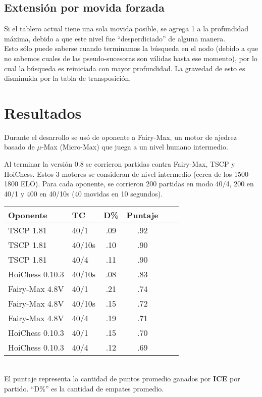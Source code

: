 \documentclass{article}
\newcommand{\ICE}[0]{{\bf ICE}}
\begin{document}
\begin{multicols}{2}
\subsection{Extensión por movida forzada}
Si el tablero actual tiene una sola movida posible, se agrega 1 a la
profundidad máxima, debido a que este nivel fue ``desperdiciado'' de
alguna manera.
\\

Esto sólo puede saberse cuando terminamos la búsqueda en el nodo
(debido a que no sabemos cuales de las pseudo-sucesoras son válidas
hasta ese momento), por lo cual la búsqueda es reiniciada con mayor
profundidad. La gravedad de esto es disminuída por la tabla de
transposición.

\section{Resultados}
Durante el desarrollo se usó de oponente a Fairy-Max\cite{fairymax}, un
motor de ajedrez basado de $\mu$-Max (Micro-Max) que juega a un nivel
humano intermedio.

Al terminar la versión 0.8 se corrieron partidas contra Fairy-Max, TSCP
y HoiChess. Estos 3 motores se consideran de nivel intermedio (cerca de
los 1500-1800 ELO). Para cada oponente, se corrieron 200 partidas en
modo 40/4, 200 en 40/1 y 400 en 40/10s (40 movidas en 10 segundos).

\begin{tabular}{|l|l|c|c|c|c|}
\hline
Oponente        & TC     & D\% & Puntaje \\ \hline
TSCP 1.81       & 40/1   & .09 & .92 \\ \hline
TSCP 1.81       & 40/10s & .10 & .90 \\ \hline
TSCP 1.81       & 40/4   & .11 & .90 \\ \hline
HoiChess 0.10.3 & 40/10s & .08 & .83 \\ \hline
Fairy-Max 4.8V  & 40/1   & .21 & .74 \\ \hline
Fairy-Max 4.8V  & 40/10s & .15 & .72 \\ \hline
Fairy-Max 4.8V  & 40/4   & .19 & .71 \\ \hline
HoiChess 0.10.3 & 40/1   & .15 & .70 \\ \hline
HoiChess 0.10.3 & 40/4   & .12 & .69 \\ \hline
\end{tabular}
\\

El puntaje representa la cantidad de puntos promedio ganados por \ICE{}
por partido. ``D\%'' es la cantidad de empates promedio.
\\


\end{multicols}
\end{document}

